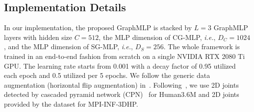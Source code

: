 \documentclass[lettersize,journal]{IEEEtran}
\begin{document}
\subsection{Implementation Details}
In our implementation, the proposed GraphMLP is stacked by $L = 3$ GraphMLP layers with hidden size $C = 512$, the MLP dimension of CG-MLP, \textit{i.e.}, $D_{C} = 1024$, and the MLP dimension of SG-MLP, \textit{i.e.}, $D_{S} = 256$. 
The whole framework is trained in an end-to-end fashion from scratch on a single NVIDIA RTX 2080 Ti GPU. 
The learning rate starts from 0.001 with a decay factor of 0.95 utilized each epoch and 0.5 utilized per 5 epochs. 
We follow the generic data augmentation (horizontal flip augmentation) in~\cite{videopose,stgcn,zou2021modulated}. 
Following~\cite{xu2021graph,zou2021modulated,zeng2021learning}, we use 2D joints detected by cascaded pyramid network (CPN)~\cite{chen2018cascaded} for Human3.6M and 2D joints provided by the dataset for MPI-INF-3DHP. 
\end{document}

